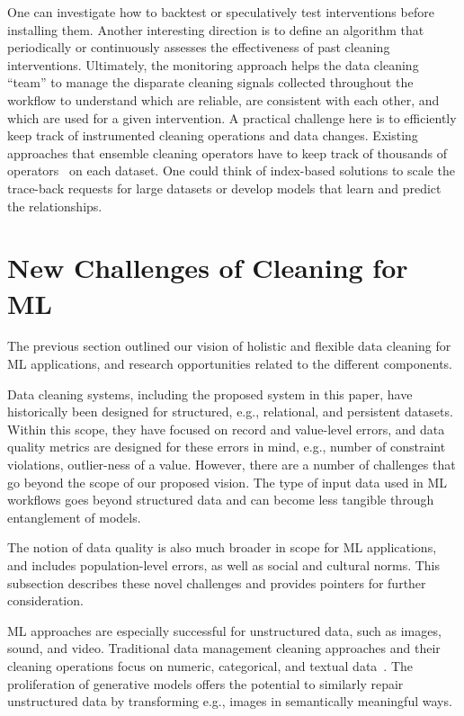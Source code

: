 \documentclass[11pt,dvipsnames]{article}
\begin{document}
One can investigate how to backtest or speculatively test interventions before installing them. Another interesting direction is to define an algorithm that periodically or continuously assesses the effectiveness of past cleaning interventions.
Ultimately, the monitoring approach helps the data cleaning ``team'' to manage the disparate cleaning signals collected throughout the workflow to understand which are reliable, are consistent with each other, and which are used for a given intervention. A practical challenge here is to efficiently keep track of instrumented cleaning operations and data changes. Existing approaches that ensemble cleaning operators have to keep track of thousands of operators~\cite{Raha,Baran} on each dataset. One could think of index-based solutions to scale the trace-back requests for large datasets or develop models that learn and predict the relationships. 



\section{New Challenges of Cleaning for ML}\label{s:challenges}
The previous section outlined our vision of holistic and flexible data cleaning for ML applications, and research opportunities related to the different components. 

Data cleaning systems, including the proposed system in this paper, have historically been designed for structured, e.g., relational,  and persistent datasets. Within this scope, they have focused on record and value-level errors, and data quality metrics are designed for these errors in mind, e.g., number of constraint violations, outlier-ness of a value.  
However, there are a number of challenges that go beyond the scope of our proposed vision.
The type of input data used in ML workflows goes beyond structured data and can become less tangible through entanglement of models. 

The notion of data quality is also much broader in scope for ML applications, and includes population-level errors, as well as social and cultural norms. This subsection describes these novel challenges and provides pointers for further consideration.



 ML approaches are especially successful for unstructured data, such as images, sound, and video. Traditional data management cleaning approaches and their cleaning operations focus on numeric, categorical, and textual data~\cite{ED2, Raha, Baran, HoloClean, HoloDetect}.  The proliferation of generative models offers the potential to similarly repair unstructured data by transforming e.g., images in semantically meaningful ways.
\end{document}

